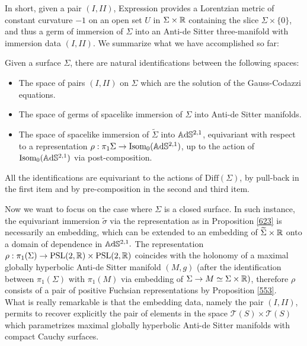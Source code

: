 In short, given a pair $(I,II)$, Expression  provides a Lorentzian metric of constant curvature $-1$ on an open set $U$ in $\Sigma\times\mathbb{R}$ containing the slice $\Sigma\times\{0\}$, and thus a germ of immersion of $\Sigma$ into an Anti-de Sitter three-manifold with immersion data $(I,II)$. We summarize what we have accomplished so far: 

\begin{proposition}\label{623}
    Given a surface $\Sigma$, there are natural identifications between the following spaces:
    \begin{itemize}
        \item The space of pairs $(I,II)$ on $\Sigma$ which are the solution of the Gauss-Codazzi equations. 
        \item The space of germs of spacelike immersion of $\Sigma$ into Anti-de Sitter manifolds. 
        \item The space of spacelike immersion of $\widetilde{\Sigma}$ into $\mathbb{A}\mathrm{d}\mathbb{S}^{2,1}$, equivariant with respect to a representation $\rho: \pi_1\Sigma\to \text{Isom}_0(\mathbb{A}\mathrm{d}\mathbb{S}^{2,1})$, up to the action of $\text{Isom}_{0}(\mathbb{A}\mathrm{d}\mathbb{S}^{2,1})$ via post-composition. 
    \end{itemize}
    All the identifications are equivariant to the actions of $\text{Diff}(\Sigma)$, by pull-back in the first item and by pre-composition in the second and third item.
\end{proposition}

Now we want to focus on the case where $\Sigma$ is a closed surface. In such instance, the equivariant immersion $\widetilde{\sigma}$ via the representation as in Proposition \ref{623} is necessarily an embedding, which can be extended to an embedding of $\widetilde{\Sigma}\times\mathbb{R}$ onto a domain of dependence in $\mathbb{A}\mathrm{d}\mathbb{S}^{2,1}.$
The representation $\rho:\pi_1(\Sigma)\to\text{PSL}(2,\mathbb{R})\times\text{PSL}(2,\mathbb{R})$ coincides with the holonomy of a maximal globally hyperbolic Anti-de Sitter manifold $(M,g)$ (after the identification between $\pi_1(\Sigma)$ with $\pi_1(M)$ via embedding of $\Sigma\to M\simeq\Sigma\times\mathbb{R})$, therefore $\rho$ consists of a pair of positive Fuchsian representations by Proposition \ref{553}. \\ 
What is really remarkable is that the embedding data, namely the pair $(I,II)$, permits to recover explicitly the pair of elements in the space $\mathcal{T}(S)\times\mathcal{T}(S)$ which parametrizes maximal globally hyperbolic Anti-de Sitter manifolds with compact Cauchy surfaces.

